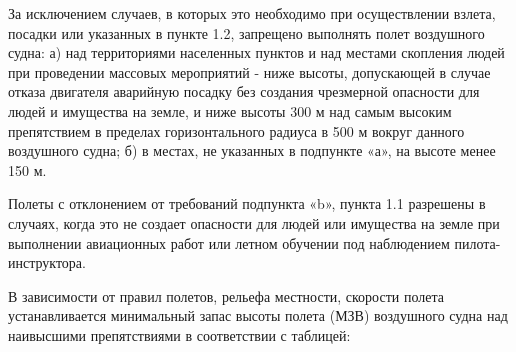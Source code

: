 \begin{appendix}
     За исключением случаев, в которых это необходимо при осуществлении взлета, посадки или указанных в пункте 1.2, запрещено выполнять полет воздушного судна: 
    а)  над территориями населенных пунктов и над местами скопления людей при проведении массовых мероприятий - ниже высоты, допускающей в случае отказа двигателя аварийную посадку без создания чрезмерной опасности для людей и имущества на земле, и ниже высоты 300 м над самым высоким препятствием в пределах горизонтального радиуса в 500 м вокруг данного воздушного судна; 
    б)  в местах, не указанных в подпункте «а», на высоте менее 150 м. 
    
     Полеты с отклонением от требований подпункта «b», пункта 1.1 разрешены в случаях, когда это не создает опасности для людей или имущества на земле при выполнении авиационных работ или летном обучении под наблюдением пилота-инструктора. 
    
     В зависимости от правил полетов, рельефа местности, скорости полета устанавливается минимальный запас высоты полета (МЗВ) воздушного судна над наивысшими препятствиями в соответствии с таблицей:
    

\end{appendix}
